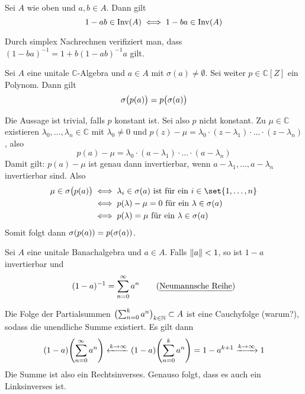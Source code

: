 \begin{bemerkung}
	Sei $A$ wie oben und $a,b \in A$. Dann gilt
	\[
		1 -ab \in \Inv(A) \iff 1 -ba \in \Inv(A)
	\]
\end{bemerkung}
\begin{beweis}
	Durch simplex Nachrechnen verifiziert man, dass $(1-ba)^{-1} = 1+ b(1- ab)^{-1} a$ gilt.
\end{beweis}

\begin{satz}[label=satz14_poly]
	Sei $A$ eine unitale $\mathds{C}$-Algebra und $a \in A$ mit $\sigma(a)\not= \emptyset$. Sei weiter $p \in \mathds{C}[Z]$ ein Polynom. Dann gilt 
	\[
		\sigma\enbrace[\big]{p(a) }= p \enbrace[\big]{\sigma(a)}
	\]
\end{satz}
\begin{beweis}
	Die Aussage ist trivial, falls $p$ konstant ist. Sei also $p$ nicht konstant. Zu $\mu \in \mathds{C}$ existieren $\lambda_0, \ldots , \lambda_n \in \mathds{C}$ mit 
	$\lambda_0 \not= 0$ und $p(z) -\mu = \lambda_0 \cdot (z- \lambda_1) \cdot  \ldots \cdot (z- \lambda_n)$, also
	\[
		p(a) - \mu = \lambda_0 \cdot (a-\lambda_1) \cdot  \ldots \cdot (a- \lambda_n)
	\]
	Damit gilt: $p(a) -\mu$ ist genau dann invertierbar, wenn $a -\lambda_1, \ldots , a-\lambda_n $ invertierbar sind. Also 
	\begin{align}
		\mu \in \sigma \enbrace[\big]{p(a)} &\iff \lambda_i \in \sigma(a) \text{ ist für ein } i \in \set{1,\ldots ,n} \\
		&\iff p(\lambda) -\mu =0 \text{ für ein } \lambda \in \sigma(a) \\
		&\iff p(\lambda)=\mu \text{ für ein } \lambda \in \sigma(a)   
	\end{align}
	Somit folgt dann $\sigma \enbrace*{p(a)} = p \enbrace*{\sigma(a)}$.
\end{beweis}

\begin{satz}[label=satz15_neumann]
	Sei $A$ eine unitale Banachalgebra und $a \in A$. Falls $\norm{a}<1$, so ist $1-a$ invertierbar und 
	\[
		(1-a)^{-1} = \sum_{n=0}^{\infty} a^n \tag*{(\Index{Neumannsche Reihe})}
	\]
\end{satz}
\begin{beweis}
	Die Folge der Partialsummen $\enbrace[\big]{\sum_{n=0}^{k} a^n}_{k \in \mathds{N}} \subset A$ ist eine Cauchyfolge (warum?), sodass die unendliche Summe existiert. Es gilt dann
	\begin{align}
		(1-a) \enbrace*{\sum_{n=0}^{\infty} a^n} \xleftarrow{k \to \infty}(1-a) \enbrace*{\sum_{n=0}^{k} a^n} = 1-a^{k+1} \xrightarrow{k \to \infty} 1
	\end{align}
	Die Summe ist also ein Rechtsinverses. Genauso folgt, dass es auch ein Linksinverses ist.
\end{beweis}

